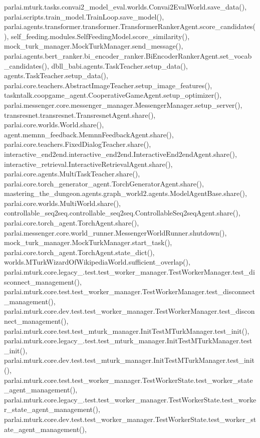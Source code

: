 parlai.\+mturk.\+tasks.\+convai2\+\_\+model\+\_\+eval.\+worlds.\+Convai2\+Eval\+World.\+save\+\_\+data(), parlai.\+scripts.\+train\+\_\+model.\+Train\+Loop.\+save\+\_\+model(), parlai.\+agents.\+transformer.\+transformer.\+Transformer\+Ranker\+Agent.\+score\+\_\+candidates(), self\+\_\+feeding.\+modules.\+Self\+Feeding\+Model.\+score\+\_\+similarity(), mock\+\_\+turk\+\_\+manager.\+Mock\+Turk\+Manager.\+send\+\_\+message(), parlai.\+agents.\+bert\+\_\+ranker.\+bi\+\_\+encoder\+\_\+ranker.\+Bi\+Encoder\+Ranker\+Agent.\+set\+\_\+vocab\+\_\+candidates(), dbll\+\_\+babi.\+agents.\+Task\+Teacher.\+setup\+\_\+data(), agents.\+Task\+Teacher.\+setup\+\_\+data(), parlai.\+core.\+teachers.\+Abstract\+Image\+Teacher.\+setup\+\_\+image\+\_\+features(), taskntalk.\+coopgame\+\_\+agent.\+Cooperative\+Game\+Agent.\+setup\+\_\+optimizer(), parlai.\+messenger.\+core.\+messenger\+\_\+manager.\+Messenger\+Manager.\+setup\+\_\+server(), transresnet.\+transresnet.\+Transresnet\+Agent.\+share(), parlai.\+core.\+worlds.\+World.\+share(), agent.\+memnn\+\_\+feedback.\+Memnn\+Feedback\+Agent.\+share(), parlai.\+core.\+teachers.\+Fixed\+Dialog\+Teacher.\+share(), interactive\+\_\+end2end.\+interactive\+\_\+end2end.\+Interactive\+End2end\+Agent.\+share(), interactive\+\_\+retrieval.\+Interactive\+Retrieval\+Agent.\+share(), parlai.\+core.\+agents.\+Multi\+Task\+Teacher.\+share(), parlai.\+core.\+torch\+\_\+generator\+\_\+agent.\+Torch\+Generator\+Agent.\+share(), mastering\+\_\+the\+\_\+dungeon.\+agents.\+graph\+\_\+world2.\+agents.\+Model\+Agent\+Base.\+share(), parlai.\+core.\+worlds.\+Multi\+World.\+share(), controllable\+\_\+seq2seq.\+controllable\+\_\+seq2seq.\+Controllable\+Seq2seq\+Agent.\+share(), parlai.\+core.\+torch\+\_\+agent.\+Torch\+Agent.\+share(), parlai.\+messenger.\+core.\+world\+\_\+runner.\+Messenger\+World\+Runner.\+shutdown(), mock\+\_\+turk\+\_\+manager.\+Mock\+Turk\+Manager.\+start\+\_\+task(), parlai.\+core.\+torch\+\_\+agent.\+Torch\+Agent.\+state\+\_\+dict(), worlds.\+M\+Turk\+Wizard\+Of\+Wikipedia\+World.\+sufficient\+\_\+overlap(), parlai.\+mturk.\+core.\+legacy\+\_.\+test.\+test\+\_\+worker\+\_\+manager.\+Test\+Worker\+Manager.\+test\+\_\+disconnect\+\_\+management(), parlai.\+mturk.\+core.\+test.\+test\+\_\+worker\+\_\+manager.\+Test\+Worker\+Manager.\+test\+\_\+disconnect\+\_\+management(), parlai.\+mturk.\+core.\+dev.\+test.\+test\+\_\+worker\+\_\+manager.\+Test\+Worker\+Manager.\+test\+\_\+disconnect\+\_\+management(), parlai.\+mturk.\+core.\+test.\+test\+\_\+mturk\+\_\+manager.\+Init\+Test\+M\+Turk\+Manager.\+test\+\_\+init(), parlai.\+mturk.\+core.\+legacy\+\_.\+test.\+test\+\_\+mturk\+\_\+manager.\+Init\+Test\+M\+Turk\+Manager.\+test\+\_\+init(), parlai.\+mturk.\+core.\+dev.\+test.\+test\+\_\+mturk\+\_\+manager.\+Init\+Test\+M\+Turk\+Manager.\+test\+\_\+init(), parlai.\+mturk.\+core.\+test.\+test\+\_\+worker\+\_\+manager.\+Test\+Worker\+State.\+test\+\_\+worker\+\_\+state\+\_\+agent\+\_\+management(), parlai.\+mturk.\+core.\+legacy\+\_.\+test.\+test\+\_\+worker\+\_\+manager.\+Test\+Worker\+State.\+test\+\_\+worker\+\_\+state\+\_\+agent\+\_\+management(), parlai.\+mturk.\+core.\+dev.\+test.\+test\+\_\+worker\+\_\+manager.\+Test\+Worker\+State.\+test\+\_\+worker\+\_\+state\+\_\+agent\+\_\+management(), 